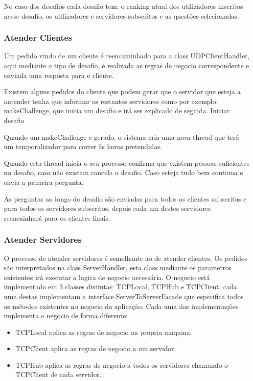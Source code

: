 \documentclass[runningheads,a4paper]{llncs}
\begin{document}
No caso dos desafios cada desafio tem: o ranking atual dos utilizadores inscritos nesse desafio, os utilizadores e servidores subscritos e as questões selecionadas.

\subsubsection{Atender Clientes}

Um pedido vindo de um cliente é reencaminhado para a class UDPClientHandler, aqui mediante o tipo de desafio, é realizada as regras de negocio correspondente e enviada uma resposta para o cliente.

Existem alguns pedidos do cliente que podem gerar que o servidor que esteja a antender tenha que informar os restantes servidores como por exemplo: makeChallenge, que inicia um desafio e irá ser explicado de seguida. 
Iniciar desafio

Quando um makeChallenge e gerado, o sistema cria uma nova thread que terá um temporalizador para correr às horas pretendidas.

Quando esta thread inicia o seu processo confirma que existem pessoas suficientes no desafio, caso não existam cancela o desafio. Caso esteja tudo bem continua e envia a primeira pergunta.

As perguntas ao longo do desafio são enviadas para todos os clientes subscritos e para todos os servidores subscritos, depois cada um destes servidores reencainhará para os clientes finais.

\subsubsection{Atender Servidores}

O processo de atender servidores é semelhante ao de atender clientes.  Os pedidos são interpretados na class ServerHandler, esta class mediante os parametros existentes irá executar a logica de negocio necessária.
O negocio está implementado em 3 classes distintas: TCPLocal, TCPHub e TCPClient. cada uma destas implementam a interface ServerToServerFacade que especifica todos os métodos existentes no negocio da aplicação.
Cada uma das implementações implementa o negocio de forma diferente:
\begin{itemize}
\item TCPLocal aplica as regras de negocio na propria maquina.
\item TCPClient aplica as regras de negocio a um servidor.
\item TCPHub aplica as regras de negocio a todos os servidores chamando o TCPClient de cada servidor.
\end{itemize}
\end{document}
